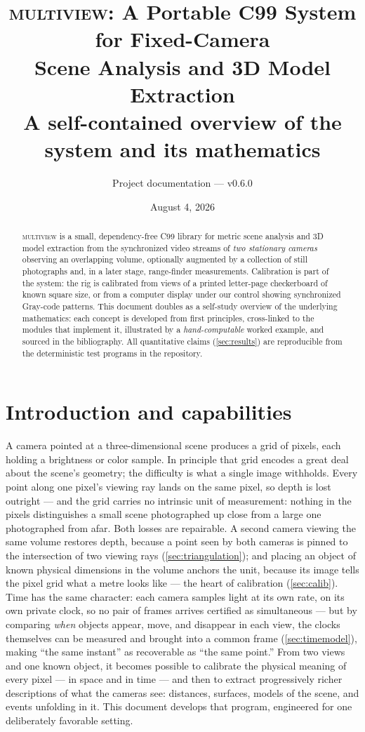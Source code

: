 \documentclass[11pt]{article}
\title{\textsc{multiview}: A Portable C99 System for Fixed-Camera\\
Scene Analysis and 3D Model Extraction\\[4pt]
\large A self-contained overview of the system and its mathematics}
\author{Project documentation --- v0.6.0}
\date{August 4, 2026}
\theoremstyle{definition}
\begin{document}
\maketitle

\begin{abstract}
\textsc{multiview} is a small, dependency-free C99 library for metric scene
analysis and 3D model extraction from the synchronized video streams of
\emph{two stationary cameras} observing an overlapping volume, optionally
augmented by a collection of still photographs and, in a later stage,
range-finder measurements. Calibration is part of the system: the rig is
calibrated from views of a printed letter-page checkerboard of known square
size, or from a computer display under our control showing synchronized
Gray-code patterns. This document doubles as a self-study overview of the
underlying mathematics: each concept is developed from first principles,
cross-linked to the modules that implement it, illustrated by a
\emph{hand-computable} worked example, and sourced in the bibliography.
All quantitative claims (\autoref{sec:results}) are reproducible from the
deterministic test programs in the repository.
\end{abstract}

\tableofcontents

\section{Introduction and capabilities}
\label{sec:capabilities}

A camera pointed at a three-dimensional scene produces a grid of pixels,
each holding a brightness or color sample. In principle that grid encodes
a great deal about the scene's geometry; the difficulty is what a single
image withholds. Every point along one pixel's viewing ray lands on the
same pixel, so depth is lost outright --- and the grid carries no
intrinsic unit of measurement: nothing in the pixels distinguishes a
small scene photographed up close from a large one photographed from
afar. Both losses are repairable. A second camera viewing the same
volume restores depth, because a point seen by both cameras is pinned to
the intersection of two viewing rays (\autoref{sec:triangulation});
and placing an object of known physical dimensions in the volume anchors
the unit, because its image tells the pixel grid what a metre looks like
--- the heart of calibration (\autoref{sec:calib}). Time has the same
character: each camera samples light at its own rate, on its own private
clock, so no pair of frames arrives certified as simultaneous --- but by
comparing \emph{when} objects appear, move, and disappear in each view,
the clocks themselves can be measured and brought into a common frame
(\autoref{sec:timemodel}), making ``the same instant'' as recoverable as
``the same point.'' From two views and
one known object, it becomes possible to calibrate the physical meaning
of every pixel --- in space and in time --- and then to extract
progressively richer descriptions of
what the cameras see: distances, surfaces, models of the scene, and
events unfolding in it. This document develops that program, engineered
for one deliberately favorable setting.
\end{document}
